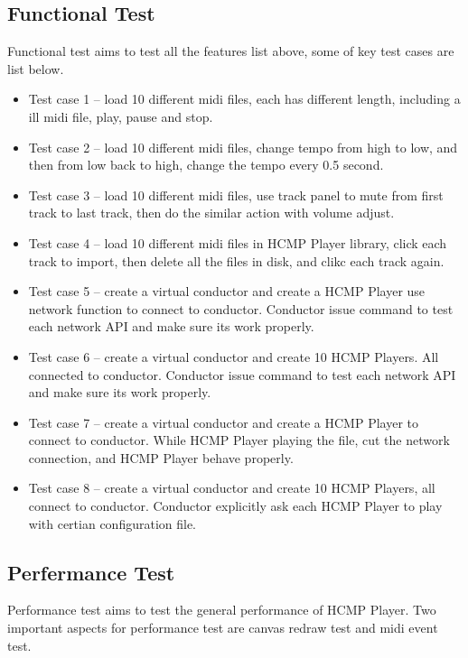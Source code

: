 \subsection{Functional Test}
Functional test aims to test all the features list above, some of key test 
cases are list below.
\begin{itemize}
  \item Test case 1 -- load 10 different midi files, each has different length, 
        including a ill midi file, play, pause and stop. 
  \item Test case 2 -- load 10 different midi files, change tempo from high to 
        low, and then from low back to high, change the tempo every 0.5 second.
  \item Test case 3 -- load 10 different midi files, use track panel to mute
        from first track to last track, then do the similar action with volume
        adjust.
  \item Test case 4 -- load 10 different midi files in HCMP Player library, click
        each track to import, then delete all the files in disk, and clikc each 
        track again.  
  \item Test case 5 -- create a virtual conductor and create a HCMP Player use  
        network function to connect to conductor. Conductor issue command
        to test each network API and make sure its work properly. 
  \item Test case 6 -- create a virtual conductor and create 10 HCMP Players. 
        All connected to conductor. Conductor issue command to test each network
        API and make sure its work properly.
  \item Test case 7 -- create a virtual conductor and create a HCMP Player to connect
        to conductor. While HCMP Player playing the file, cut the network connection,
        and HCMP Player behave properly.
  \item Test case 8 -- create a virtual conductor and create 10 HCMP Players, all
        connect to conductor. Conductor explicitly ask each HCMP Player to play with
        certian configuration file.
\end{itemize}

\subsection{Perfermance Test}
Performance test aims to test the general performance of HCMP Player. Two important  
aspects for performance test are canvas redraw test and midi event test. 

